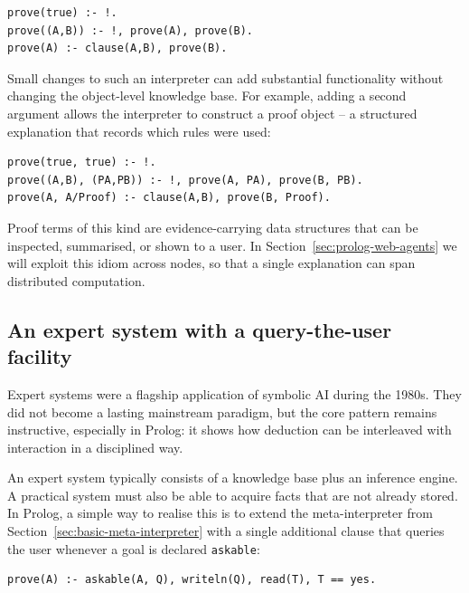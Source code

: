\begin{verbatim}
prove(true) :- !.
prove((A,B)) :- !, prove(A), prove(B).
prove(A) :- clause(A,B), prove(B).
\end{verbatim}

\noindent Small changes to such an interpreter can add substantial functionality without changing the object-level knowledge base. For example, adding a second argument allows the interpreter to construct a proof object -- a structured explanation that records which rules were used:

\begin{verbatim}
prove(true, true) :- !.
prove((A,B), (PA,PB)) :- !, prove(A, PA), prove(B, PB).
prove(A, A/Proof) :- clause(A,B), prove(B, Proof).
\end{verbatim}

\noindent Proof terms of this kind are evidence-carrying data structures that can be inspected, summarised, or shown to a user. In Section~\ref{sec:prolog-web-agents} we will exploit this idiom across nodes, so that a single explanation can span distributed computation.

\subsection{An expert system with a query-the-user facility}
\label{sec:query-the-user}

Expert systems were a flagship application of symbolic AI during the 1980s. They did not become a lasting mainstream paradigm, but the core pattern remains instructive, especially in Prolog: it shows how deduction can be interleaved with interaction in a disciplined way. 

An expert system typically consists of a knowledge base plus an inference engine. A practical system must also be able to acquire facts that are not already stored. In Prolog, a simple way to realise this is to extend the meta-interpreter from Section~\ref{sec:basic-meta-interpreter} with a single additional clause that queries the user whenever a goal is declared \texttt{askable}:


\begin{verbatim}
prove(A) :- askable(A, Q), writeln(Q), read(T), T == yes.
\end{verbatim}

